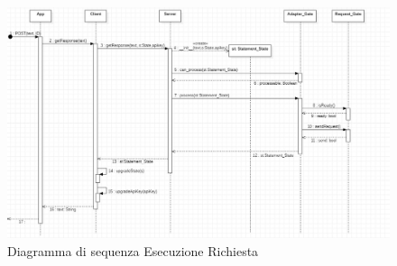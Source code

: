 \begin{landscape}
	\begin{figure}[H]
	\centering\includegraphics[width=\linewidth]{images/diagramma_sequenza_server.jpg}
    \caption{Diagramma di sequenza Esecuzione Richiesta }
	\end{figure}
\end{landscape}
